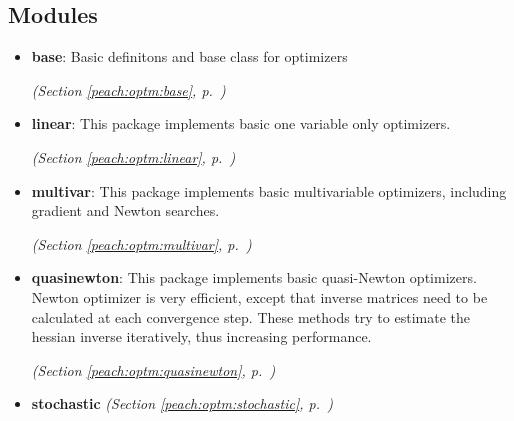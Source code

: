 \subsection{Modules}

\begin{itemize}
\setlength{\parskip}{0ex}
\item \textbf{base}: 
Basic definitons and base class for optimizers


  \textit{(Section \ref{peach:optm:base}, p.~\pageref{peach:optm:base})}

\item \textbf{linear}: 
This package implements basic one variable only optimizers.


  \textit{(Section \ref{peach:optm:linear}, p.~\pageref{peach:optm:linear})}

\item \textbf{multivar}: 
This package implements basic multivariable optimizers, including gradient and
Newton searches.


  \textit{(Section \ref{peach:optm:multivar}, p.~\pageref{peach:optm:multivar})}

\item \textbf{quasinewton}: 
This package implements basic quasi-Newton optimizers. Newton optimizer is very
efficient, except that inverse matrices need to be calculated at each
convergence step. These methods try to estimate the hessian inverse iteratively,
thus increasing performance.


  \textit{(Section \ref{peach:optm:quasinewton}, p.~\pageref{peach:optm:quasinewton})}

\item \textbf{stochastic}
  \textit{(Section \ref{peach:optm:stochastic}, p.~\pageref{peach:optm:stochastic})}

\end{itemize}


